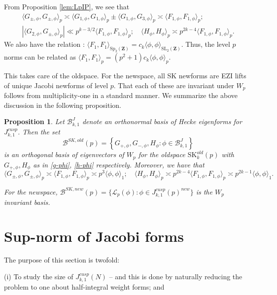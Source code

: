 \documentclass[11pt]{amsart}
\numberwithin{equation}{section}
\theoremstyle{plain}
\newtheorem{prop}[thm]{Proposition}
\theoremstyle{definition}
\newcommand{\mf}{\mathbf}
\newcommand{\mc}{\mathcal}
\newcommand{\mrm}{\mathrm}
\newcommand{\lan}{\langle }
\newcommand{\ran}{\rangle}
\newcommand{\q}{\quad}
\newcommand{\sltwo}{\mrm{SL}_2(\mf Z)}
\newcommand{\sptwo}{\mrm{Sp}_2( \mf Z)}
\newcommand{\jkp}{J_{k,1}^{cusp}(p)}
\newcommand{\jkn}{J^{cusp}_{k,1}(N)}
\newcommand{\skk}{\mrm{SK}_k}
\begin{document}
From Proposition \ref{lem:LpIP}, we see that 
\begin{align}\label{normpm}
    \lan G_{\pm,\phi}, G_{\pm,\phi} \ran_p \asymp \lan G_{1,\phi}, G_{1,\phi} \ran_p\pm \lan G_{1,\phi}, G_{3,\phi} \ran_p\asymp \lan F_{1,\phi}, F_{1,\phi}\ran_p;\\
    |\lan G_{2,\phi}, G_{\pm, \phi} \ran_p| \ll  p^{k-3/2} \lan F_{1,\phi}, F_{1,\phi}\ran_p;\q \lan H_\phi, H_\phi \ran_p \asymp p^{2k-4}\lan F_{1,\phi}, F_{1,\phi}\ran_p.
\end{align}
We also have the relation \cite[pp. 551]{KS}: $ \lan F_1, F_1\ran_{\sptwo} = c_k \lan \phi, \phi \ran_{\sltwo}$. Thus, the level $p$ norms can be related as $\lan F_1, F_1\ran_{p}= (p^2+1) c_k \lan \phi, \phi \ran_{p}$.


This takes care of the oldspace. For the newspace, all SK newforms are EZI lifts of unique Jacobi newforms of level $p$. That each of these are invariant under $W_p$ follows from multiplicity-one in a standard manner.
We summarize the above discussion in the following proposition.

\begin{prop}\label{oldbasis}
    Let $\mc B_{k,1}^J$ denote an orthonormal basis of Hecke eigenforms for $J_{k,1}^{cusp}$. Then the set
\begin{equation}
    \mc B ^{SK, old}(p)=\left\{ G_{+,\phi}, G_{-,\phi}, H_\phi:  \phi\in \mc B_{k,1}^J\right\}
\end{equation}
is an orthogonal basis of eigenvectors of $W_p$ for the oldspace $\skk^{old}(p)$ with $G_{+,\phi}, H_\phi$ as in \eqref{g-phi}, \eqref{h-phi} respectively.  Moreover, we have that 
\begin{equation}
    \lan G_{\pm,\phi}, G_{\pm,\phi} \ran_p \asymp \lan F_{1,\phi}, F_{1,\phi}\ran_p\asymp p^3 \lan \phi, \phi \ran_{1};\q  \lan H_\phi, H_\phi \ran_p \asymp p^{2k-4}\lan F_{1,\phi}, F_{1,\phi}\ran_p\asymp p^{2k-1}\lan \phi, \phi \ran_{1}.
\end{equation}

For the newspace, $\mc B ^{SK, new}(p)=\{ \mc L_p(\phi) \colon \phi \in \jkp^{new} \}$ is the $W_p$ invariant basis.
 \end{prop}

\section{Sup-norm of Jacobi forms} \label{jacobi-sup-norms}
The purpose of this section is twofold:

(i) To study the size of $\jkn$ -- and this is done by naturally reducing the problem to one about half-integral weight forms; and
\end{document}
